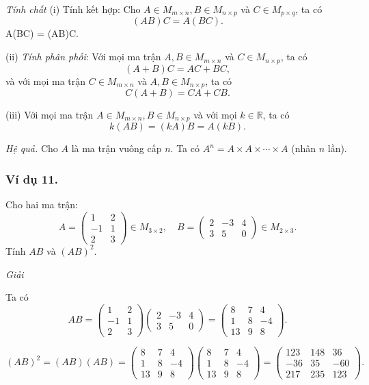 \textit{Tính chất}
(i) Tính kết hợp: Cho \( A \in M_{m \times n}, B \in M_{n \times p} \) và \( C \in M_{p \times q} \), ta có
\[
(AB)C = A(BC).
\]
A(BC) = (AB)C.

(ii) \textit{Tính phân phối}: Với mọi ma trận \( A, B \in M_{m \times n} \) và \( C \in M_{n \times p} \), ta có
\[
(A + B)C = AC + BC,
\]
và với mọi ma trận \( C \in M_{m \times n} \) và \( A, B \in M_{n \times p} \), ta có
\[
C(A + B) = CA + CB.
\]

(iii) Với mọi ma trận \( A \in M_{m \times n}, B \in M_{n \times p} \) và với mọi \( k \in \mathbb{R} \), ta có
\[
k(AB) = (kA)B = A(kB).
\]

\textit{Hệ quả.} Cho \( A \) là ma trận vuông cấp \( n \). Ta có \( A^n = A \times A \times \cdots \times A \) (nhân \( n \) lần).

\subsubsection*{Ví dụ 11.}
Cho hai ma trận:
\[
A = \begin{pmatrix}
1 & 2 \\
-1 & 1 \\
2 & 3
\end{pmatrix} \in M_{3 \times 2}
, \quad
B = \begin{pmatrix}
2 & -3 & 4 \\
3 & 5 & 0
\end{pmatrix} \in M_{2 \times 3}
.
\]
Tính \( AB \) và \( (AB)^2 \).

\textit{Giải}

Ta có
\[
AB = \begin{pmatrix}
1 & 2 \\
-1 & 1 \\
2 & 3
\end{pmatrix}
\begin{pmatrix}
2 & -3 & 4 \\
3 & 5 & 0
\end{pmatrix}
= \begin{pmatrix}
8 & 7 & 4 \\
1 & 8 & -4 \\
13 & 9 & 8
\end{pmatrix}
.
\]

\[
(AB)^2 = (AB)(AB) = \begin{pmatrix}
8 & 7 & 4 \\
1 & 8 & -4 \\
13 & 9 & 8
\end{pmatrix}
\begin{pmatrix}
8 & 7 & 4 \\
1 & 8 & -4 \\
13 & 9 & 8
\end{pmatrix}
= \begin{pmatrix}
123 & 148 & 36 \\
-36 & 35 & -60 \\
217 & 235 & 123
\end{pmatrix}
.
\]

